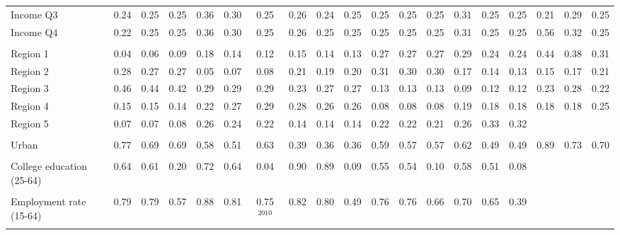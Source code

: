 \begin{tabular}{l*{18}{c}}
Income Q3 & 0.24 & 0.25 & 0.25 & 0.36 & 0.30 & 0.25 & 0.26 & 0.24 & 0.25 & 0.25 & 0.25 & 0.25 & 0.31 & 0.25 & 0.25 & 0.21 & 0.29 & 0.25 \\
Income Q4 & 0.22 & 0.25 & 0.25 & 0.36 & 0.30 & 0.25 & 0.26 & 0.25 & 0.25 & 0.25 & 0.25 & 0.25 & 0.31 & 0.25 & 0.25 & 0.56 & 0.32 & 0.25 \\
\\
Region 1 & 0.04 & 0.06 & 0.09 & 0.18 & 0.14 & 0.12 & 0.15 & 0.14 & 0.13 & 0.27 & 0.27 & 0.27 & 0.29 & 0.24 & 0.24 & 0.44 & 0.38 & 0.31 \\
Region 2 & 0.28 & 0.27 & 0.27 & 0.05 & 0.07 & 0.08 & 0.21 & 0.19 & 0.20 & 0.31 & 0.30 & 0.30 & 0.17 & 0.14 & 0.13 & 0.15 & 0.17 & 0.21 \\
Region 3 & 0.46 & 0.44 & 0.42 & 0.29 & 0.29 & 0.29 & 0.23 & 0.27 & 0.27 & 0.13 & 0.13 & 0.13 & 0.09 & 0.12 & 0.12 & 0.23 & 0.28 & 0.22 \\
Region 4 & 0.15 & 0.15 & 0.14 & 0.22 & 0.27 & 0.29 & 0.28 & 0.26 & 0.26 & 0.08 & 0.08 & 0.08 & 0.19 & 0.18 & 0.18 & 0.18 & 0.18 & 0.25 \\
Region 5 & 0.07 & 0.07 & 0.08 & 0.26 & 0.24 & 0.22 & 0.14 & 0.14 & 0.14 & 0.22 & 0.22 & 0.21 & 0.26 & 0.33 & 0.32 & & & \\
\\
Urban & 0.77 & 0.69 & 0.69 & 0.58 & 0.51 & 0.63 & 0.39 & 0.36 & 0.36 & 0.59 & 0.57 & 0.57 & 0.62 & 0.49 & 0.49 & 0.89 & 0.73 & 0.70 \\
\\
College education (25-64) & 0.64 & 0.61 & 0.20 & 0.72 & 0.64 & 0.04 & 0.90 & 0.89 & 0.09 & 0.55 & 0.54 & 0.10 & 0.58 & 0.51 & 0.08 & & & \\
\\
Employment rate (15-64) & 0.79 & 0.79 & 0.57 & 0.88 & 0.81 & 0.75$^\text{2010}$ & 0.82 & 0.80 & 0.49 & 0.76 & 0.76 & 0.66 & 0.70 & 0.65 & 0.39 & & & \\
\\
\bottomrule
\end{tabular}